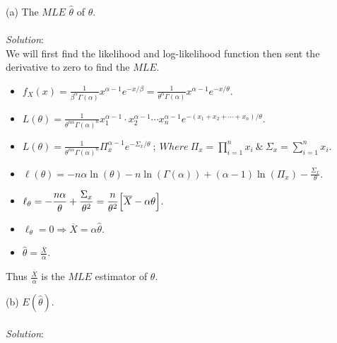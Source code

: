 \documentclass[12pt]{article}
\newcommand{\XB}{\color{black}}
\newcommand{\XBB}{\color{blue}}
\newcommand{\ds}{\displaystyle}
\begin{document}
\XBB\hrulefill\XB
\vspace{5mm}

(a) The $ MLE $ $ \hat{\theta} $ of $ \theta $. \\
\vspace{2.5mm} \\
\textit{Solution}:
\vspace{2.5mm} \\

\noindent
We will first find the likelihood and log-likelihood function then sent the derivative to zero to find the $ MLE $. \\

\begin{itemize}
    \item $ \ds f_{X}(x) = \frac{1}{\beta^{\alpha}\Gamma(\alpha)}x^{\alpha - 1}e^{-x/\beta} = \frac{1}{\theta^{\alpha}\Gamma(\alpha)}x^{\alpha - 1}e^{-x/\theta} $.
    \item $ \ds L(\theta) = \frac{1}{\theta^{n\alpha}\Gamma(\alpha)^{n}}x_{1}^{\alpha - 1} \cdot x_{2}^{\alpha - 1} \cdots x_{n}^{\alpha - 1}e^{-(x_{1} + x_{2} + \cdots + x_{n})/\theta} $.
    \item $ \ds L(\theta) = \frac{1}{\theta^{n\alpha}\Gamma(\alpha)^{n}} \Pi_{x}^{\alpha - 1} e^{-\Sigma_{x}/\theta} \ ; \ Where \ \Pi_{x} = \prod_{i=1}^{n} x_{i} \ \& \ \Sigma_{x} = \sum_{i=1}^{n} x_{i} $.
    \item $ \ds \ell(\theta) = -n\alpha\ln(\theta) - n\ln(\Gamma(\alpha)) + (\alpha - 1)\ln(\Pi_{x}) - \frac{\Sigma_{x}}{\theta} $.
    \item $ \ds \ell_{\theta} = -\frac{n\alpha}{\theta} + \frac{\Sigma_{x}}{\theta^{2}} = \frac{n}{\theta^{2}} \Bigl[ \overline{X} - \alpha\theta \Bigr] $.
    \item $ \ds \ell_{\theta} = 0 \Rightarrow \overline{X} = \alpha\hat{\theta} $.
    \item $ \ds \hat{\theta} = \frac{\overline{X}}{\alpha} $.
\end{itemize}

\noindent
Thus $ \ds \frac{\overline{X}}{\alpha} $ is the $ MLE $ estimator of $ \theta $. \\

\vspace{2.5mm}
\newpage

(b) $ E(\hat{\theta}) $. \\
\vspace{2.5mm} \\
\textit{Solution}:
\vspace{2.5mm} \\
\end{document}

